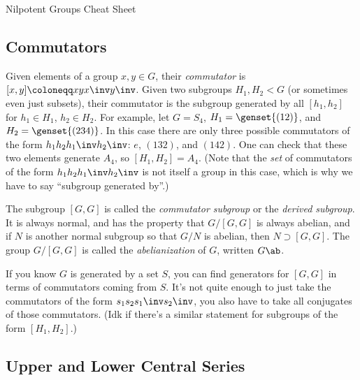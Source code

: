 \begin{center}
    \huge Nilpotent Groups Cheat Sheet
\end{center}

\subsection*{Commutators}

Given elements of a group $x,y \in G$, their \emph{commutator} is $[x,y] \coloneqq xyx\inv y\inv$. Given two subgroups $H_1, H_2 < G$ (or sometimes even just subsets), their commutator is the subgroup generated by all $[h_1,h_2]$ for $h_1 \in H_1$, $h_2 \in H_2$. For example, let $G = S_4$, $H_1 = \genset{(12)}$, and $H_2 = \genset{(234)}$. In this case there are only three possible commutators of the form $h_1 h_2 h_1\inv h_2\inv$: $e$, $(132)$, and $(142)$. One can check that these two elements generate $A_4$, so $[H_1,H_2] = A_4$. (Note that the \emph{set} of commutators of the form $h_1 h_2 h_1\inv h_2\inv$ is not itself a group in this case, which is why we have to say ``subgroup generated by''.)

The subgroup $[G,G]$ is called the \emph{commutator subgroup} or the \emph{derived subgroup}. It is always normal, and has the property that $G/[G,G]$ is always abelian, and if $N$ is another normal subgroup so that $G/N$ is abelian, then $N \supset [G,G]$. The group $G/[G,G]$ is called the \emph{abelianization} of $G$, written $G\ab$.

If you know $G$ is generated by a set $S$, you can find generators for $[G,G]$ in terms of commutators coming from $S$. It's not quite enough to just take the commutators of the form $s_1 s_2 s_1\inv s_2\inv$, you also have to take all conjugates of those commutators. (Idk if there's a similar statement for subgroups of the form $[H_1,H_2]$.)

\subsection*{Upper and Lower Central Series}

